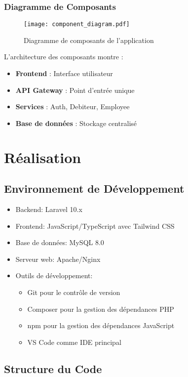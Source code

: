 \documentclass[12pt,a4paper]{report}
\begin{document}
\subsection{Diagramme de Composants}
\begin{figure}[H]
    \centering
    \texttt{[image: component\_diagram.pdf]}
    \caption{Diagramme de composants de l'application}
    \label{fig:component_diagram}
\end{figure}

L'architecture des composants montre :
\begin{itemize}
    \item \textbf{Frontend} : Interface utilisateur
    \item \textbf{API Gateway} : Point d'entrée unique
    \item \textbf{Services} : Auth, Debiteur, Employee
    \item \textbf{Base de données} : Stockage centralisé
\end{itemize}

\chapter{Réalisation}
\section{Environnement de Développement}
\begin{itemize}
    \item Backend: Laravel 10.x
    \item Frontend: JavaScript/TypeScript avec Tailwind CSS
    \item Base de données: MySQL 8.0
    \item Serveur web: Apache/Nginx
    \item Outils de développement:
        \begin{itemize}
            \item Git pour le contrôle de version
            \item Composer pour la gestion des dépendances PHP
            \item npm pour la gestion des dépendances JavaScript
            \item VS Code comme IDE principal
        \end{itemize}
\end{itemize}

\section{Structure du Code}
\end{document}
